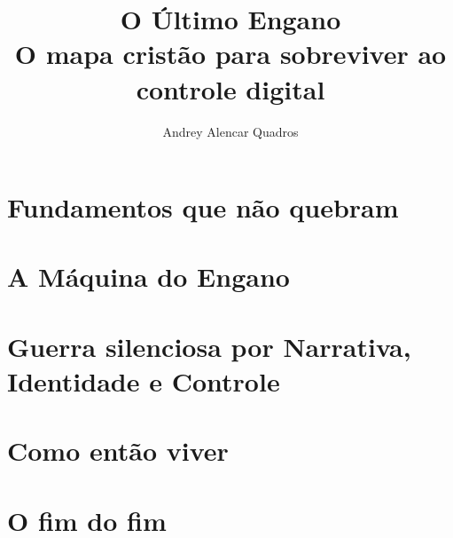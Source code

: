 \documentclass[11pt,openany]{scrbook} %
\title{\textbf{O Último Engano}\\\large O mapa cristão para sobreviver ao controle digital}
\author{Andrey Alencar Quadros}
\date{\the\year}
\begin{document}
\frontmatter

\maketitle








\tableofcontents

\mainmatter



\part{Fundamentos que não quebram}





\part{A Máquina do Engano}






\part{Guerra silenciosa por Narrativa, Identidade e Controle}




\part{Como então viver}





\part{O fim do fim}





\backmatter





\end{document}
